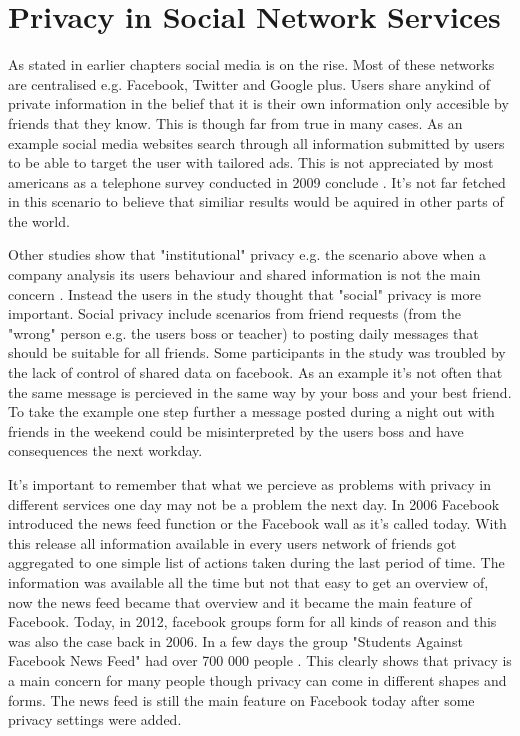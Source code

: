 \section{Privacy in Social Network Services}
As stated in earlier chapters social media is on the rise.
Most of these networks are centralised e.g. Facebook, Twitter and Google plus.
Users share anykind of private information in the belief that it is their own information only accesible by friends that they know.
This is though far from true in many cases.
As an example social media websites search through all information submitted by users to be able to target the user with tailored ads.
This is not appreciated by most americans as a telephone survey conducted in 2009 conclude \cite{turow2009}.
It's not far fetched in this scenario to believe that similiar results would be aquired in other parts of the world.

Other studies show that "institutional" privacy e.g. the scenario above when a company analysis its users behaviour and shared information is not the main concern \cite{raynes-goldie2010}.
Instead the users in the study thought that "social" privacy is more important.
Social privacy include scenarios from friend requests (from the "wrong" person e.g. the users boss or teacher) to posting daily messages that should be suitable for all friends.
Some participants in the study was troubled by the lack of control of shared data on facebook.
As an example it's not often that the same message is percieved in the same way by your boss and your best friend.
To take the example one step further a message posted during a night out with friends in the weekend could be misinterpreted by the users boss and have consequences the next workday.

It's important to remember that what we percieve as problems with privacy in different services one day may not be a problem the next day.
In 2006 Facebook introduced the news feed function or the Facebook wall as it's called today.
With this release all information available in every users network of friends got aggregated to one simple list of actions taken during the last period of time.
The information was available all the time but not that easy to get an overview of, now the news feed became that overview and it became the main feature of Facebook.
Today, in 2012, facebook groups form for all kinds of reason and this was also the case back in 2006.
In a few days the group "Students Against Facebook News Feed" had over 700 000 people \cite{boyd2008}.
This clearly shows that privacy is a main concern for many people though privacy can come in different shapes and forms.
The news feed is still the main feature on Facebook today after some privacy settings were added.

